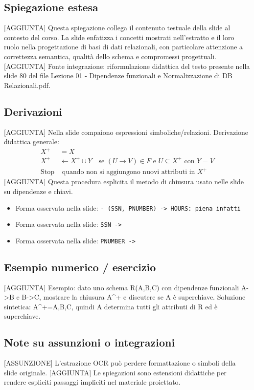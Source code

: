 \documentclass[11pt]{article}
\begin{document}
\subsection*{Spiegazione estesa}
[AGGIUNTA] Questa spiegazione collega il contenuto testuale della slide al contesto del corso. La slide enfatizza i concetti mostrati nell'estratto e il loro ruolo nella progettazione di basi di dati relazionali, con particolare attenzione a correttezza semantica, qualità dello schema e compromessi progettuali.
[AGGIUNTA] Fonte integrazione: riformulazione didattica del testo presente nella slide 80 del file Lezione 01 - Dipendenze funzionali e Normalizzazione di DB Relazionali.pdf.
\subsection*{Derivazioni}
[AGGIUNTA] Nella slide compaiono espressioni simboliche/relazioni. Derivazione didattica generale:
\begin{align*}
X^+ &= X \\
X^+ &\leftarrow X^+ \cup Y \quad \text{se } (U \to V) \in F \text{ e } U \subseteq X^+ \text{ con } Y=V \\
\text{Stop} &\text{ quando non si aggiungono nuovi attributi in } X^+
\end{align*}
[AGGIUNTA] Questa procedura esplicita il metodo di chiusura usato nelle slide su dipendenze e chiavi.
\begin{itemize}[leftmargin=*]
\item Forma osservata nella slide: \texttt{-    (SSN, PNUMBER) -> HOURS: piena infatti}
\item Forma osservata nella slide: \texttt{SSN ->}
\item Forma osservata nella slide: \texttt{PNUMBER ->}
\end{itemize}
\subsection*{Esempio numerico / esercizio}
[AGGIUNTA] Esempio: dato uno schema R(A,B,C) con dipendenze funzionali A->B e B->C, mostrare la chiusura A^+ e discutere se A è superchiave. Soluzione sintetica: A^+={A,B,C}, quindi A determina tutti gli attributi di R ed è superchiave.
\subsection*{Note su assunzioni o integrazioni}
[ASSUNZIONE] L'estrazione OCR può perdere formattazione o simboli della slide originale.
[AGGIUNTA] Le spiegazioni sono estensioni didattiche per rendere espliciti passaggi impliciti nel materiale proiettato.
\end{document}
